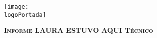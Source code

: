 \documentclass[a4paper]{article} %
\newcommand{\logoPortada}{Mantis.jpg}
\begin{document}
	\begin{titlepage}
	\centering
	\texttt{[image: \\logoPortada]}\par
	\vspace{1cm}
		{\scshape\LARGE \textbf{Informe LAURA ESTUVO AQUI Técnico}}
	\end{titlepage}
\end{document}
